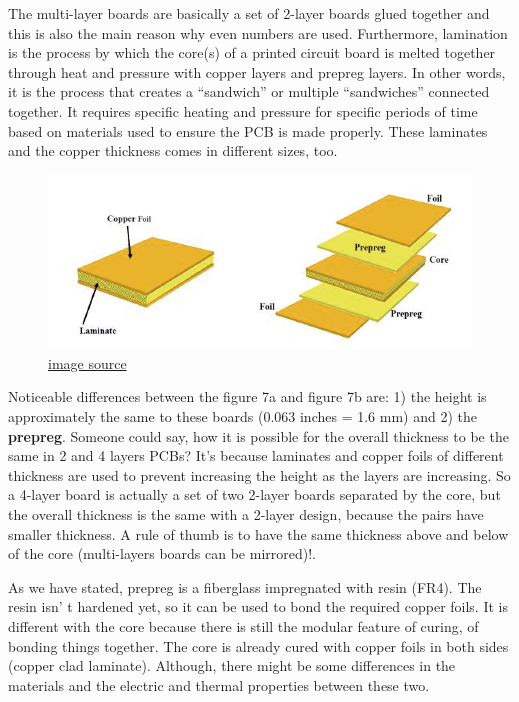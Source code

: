 \documentclass[final]{cubedoc}
\begin{document}
	The multi-layer boards are basically a set of 2-layer boards glued together and this is also the main reason why even numbers are used. Furthermore, lamination is the process by which the core(s) of a printed circuit board is melted together through heat and pressure with copper layers and prepreg layers. In other words, it is the process that creates a “sandwich” or multiple “sandwiches” connected together. It requires specific heating and pressure for specific periods of time based on materials used to ensure the PCB is made properly.  These laminates and the copper thickness comes in different sizes, too.
	
	
	\begin{figure}[h!]
		\centering
		\includegraphics[keepaspectratio, height=.25\textheight, width=\textwidth]{assets/multi_layer_laminate_2.png}
		\caption{\href{https://web.archive.org/web/20200814083836/https://www.pcbcart.com/article/content/surface-finish-intro-and-comparision.html}{image source}}
	\end{figure}
	
	Noticeable differences between the figure 7a and figure 7b are: 1) the height is approximately the same to these boards (0.063 inches = 1.6 mm) and 2) the \textbf{prepreg}. Someone could say, how it is possible for the overall thickness to be the same in 2 and 4 layers PCBs? It’s because laminates and copper foils of different thickness are used to prevent increasing the height as the layers are increasing. So a 4-layer board is actually a set of two 2-layer boards separated by  the core, but the overall thickness is the same with a 2-layer design, because the pairs have smaller thickness. A rule of thumb is to have the same thickness above and below of the core (multi-layers boards can be mirrored)!.
	
	As we have stated, prepreg is a fiberglass impregnated with resin (FR4). The resin isn'
	t hardened yet, so it can be used to bond the required copper foils. It is different with the core because there is still the modular feature of curing, of bonding things together. The core is already cured with copper foils in both sides (copper clad laminate). Although, there might be some differences in the materials and the electric and thermal properties between these two.
	
\end{document}
